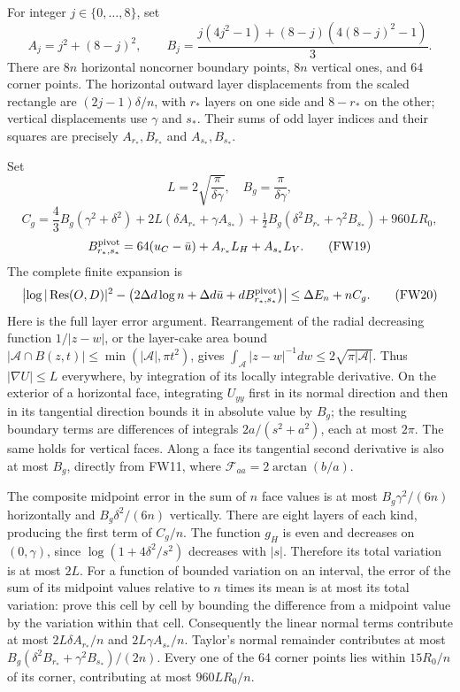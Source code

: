 \documentclass[11pt]{article}
\begin{document}
For integer \(j\in\{0,\ldots,8\}\), set \[
A_j=j^2+(8-j)^2,\qquad
B_j=\frac{j(4j^2-1)+(8-j)(4(8-j)^2-1)}3.
\] There are \(8n\) horizontal noncorner boundary points, \(8n\) vertical ones, and \(64\) corner points. The horizontal outward layer displacements from the scaled rectangle are \((2j-1)\delta/n\), with \(r_*\) layers on one side and \(8-r_*\) on the other; vertical displacements use \(\gamma\) and \(s_*\). Their sums of odd layer indices and their squares are precisely \(A_{r_*},B_{r_*}\) and \(A_{s_*},B_{s_*}\).

Set \[
L=2\sqrt{\frac\pi{\delta\gamma}},\quad B_g=\frac\pi{\delta\gamma},
\] \[
C_g=\frac43 B_g(\gamma^2+\delta^2)
+2L(\delta A_{r_*}+\gamma A_{s_*})
+\tfrac12B_g(\delta^2B_{r_*}+\gamma^2B_{s_*})+960LR_0,
\] \[
B_{r_*,s_*}^{\rm pivot}=64(u_C-\bar u)+A_{r_*}L_H+A_{s_*}L_V.
\tag{FW19}
\] The complete finite expansion is \[
\left|\log|\operatorname{Res}(O,D)|^2-
\left(2\Delta d\log n+\Delta d\bar u+dB_{r_*,s_*}^{\rm pivot}\right)\right|
\le\Delta E_n+nC_g.
\tag{FW20}
\] Here is the full layer error argument. Rearrangement of the radial decreasing function \(1/|z-w|\), or the layer-cake area bound \(|\mathcal A\cap B(z,t)|\le\min(|\mathcal A|,\pi t^2)\), gives \(\int_\mathcal A|z-w|^{-1}dw\le2\sqrt{\pi|\mathcal A|}\). Thus \(|\nabla U|\le L\) everywhere, by integration of its locally integrable derivative. On the exterior of a horizontal face, integrating \(U_{yy}\) first in its normal direction and then in its tangential direction bounds it in absolute value by \(B_g\); the resulting boundary terms are differences of integrals \(2a/(s^2+a^2)\), each at most \(2\pi\). The same holds for vertical faces. Along a face its tangential second derivative is also at most \(B_g\), directly from FW11, where \(\mathscr F_{aa}=2\arctan(b/a)\).

The composite midpoint error in the sum of \(n\) face values is at most \(B_g\gamma^2/(6n)\) horizontally and \(B_g\delta^2/(6n)\) vertically. There are eight layers of each kind, producing the first term of \(C_g/n\). The function \(g_H\) is even and decreases on \((0,\gamma)\), since \(\log(1+4\delta^2/s^2)\) decreases with \(|s|\). Therefore its total variation is at most \(2L\). For a function of bounded variation on an interval, the error of the sum of its midpoint values relative to \(n\) times its mean is at most its total variation: prove this cell by cell by bounding the difference from a midpoint value by the variation within that cell. Consequently the linear normal terms contribute at most \(2L\delta A_{r_*}/n\) and \(2L\gamma A_{s_*}/n\). Taylor's normal remainder contributes at most \(B_g(\delta^2B_{r_*}+\gamma^2B_{s_*})/(2n)\). Every one of the 64 corner points lies within \(15R_0/n\) of its corner, contributing at most \(960LR_0/n\).
\end{document}
